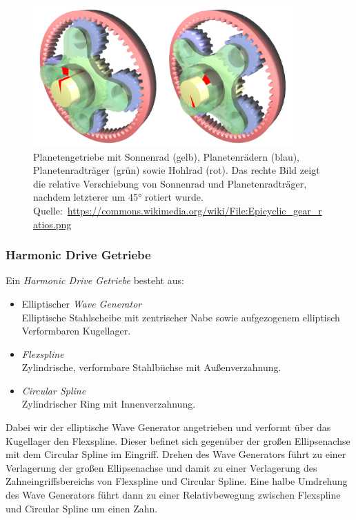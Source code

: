 \documentclass[a4paper, 11pt, accentcolor = tud3b]{tudreport}
\begin{document}
					\begin{figure}
						\centering
						\includegraphics[width = 0.9\textwidth]{epicyclicgear}
						\caption{Planetengetriebe mit Sonnenrad (gelb), Planetenrädern (blau), Planetenradträger (grün) sowie Hohlrad (rot). Das rechte Bild zeigt die relative Verschiebung von Sonnenrad und Planetenradträger, nachdem letzterer um \ang{45} rotiert wurde. Quelle:~\url{https://commons.wikimedia.org/wiki/File:Epicyclic_gear_ratios.png}}
					\end{figure}

				\subsubsection{Harmonic Drive Getriebe}
					Ein \emph{Harmonic Drive Getriebe} besteht aus:
					\begin{itemize}
						\item Elliptischer \emph{Wave Generator} \\ Elliptische Stahlscheibe mit zentrischer Nabe sowie aufgezogenem elliptisch Verformbaren Kugellager.
						\item \emph{Flexspline} \\ Zylindrische, verformbare Stahlbüchse mit Außenverzahnung.
						\item \emph{Circular Spline} \\ Zylindrischer Ring mit Innenverzahnung.
					\end{itemize}
				
					Dabei wir der elliptische Wave Generator angetrieben und verformt über das Kugellager den Flexspline. Dieser befinet sich gegenüber der großen Ellipsenachse mit dem Circular Spline im Eingriff. Drehen des Wave Generators führt zu einer Verlagerung der großen Ellipsenachse und damit zu einer Verlagerung  des Zahneingriffsbereichs von Flexspline und Circular Spline. Eine halbe Umdrehung des Wave Generators führt dann zu einer Relativbewegung zwischen Flexspline und Circular Spline um einen Zahn.
					
\end{document}

